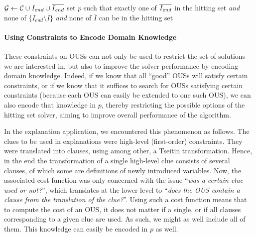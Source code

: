 \begin{algorithm}[ht]
  \caption{$\call{bestStep--c-OUS}({\cal C},f,I,I_{end})$}
  \label{alg:singleStepExplain3}
$\mathcal{G}  \gets {\cal C} \cup I_{end} \cup \overline{I_{\mathit{end}}}$\;
set $p$ such that exactly one of $\overline{I_{\mathit{end}}}$ in the hitting set \textit{and} none of $\{I_{end} \setminus I\}$ \textit{and} none of $\bar{I}$ can be in the hitting set\;
\;
\end{algorithm}



\paragraph{Using Constraints to Encode Domain Knowledge}
These constraints on OUSs can not only be used to restrict the set of solutions we are interested in, but also to improve the solver performance by encoding domain knowledge.
Indeed, if we know that all ``good'' OUSs will satisfy certain constraints, or if we know that it suffices to search for OUSs satisfying certain constraints (because each OUS can easily be extended to one such OUS),  we can also encode that knowledge in $p$, thereby restricting the possible options of the hitting set solver, aiming to improve overall performance of the algorithm. 

In the explanation application, we encountered this phenomenon as follows. 
The clues to be used in explanations were high-level (first-order) constraints. They were translated into clauses, using among other, a Tseitin transformation.
Hence, in the end the transformation of a single high-level clue consists of several clauses, of which some are definitions of newly introduced variables. 
Now, the associated cost function was only concerned with the issue ``\emph{was a certain clue used or not?}'', which translates at the lower level to ``\emph{does the OUS contain a clause from the translation of the clue?}''.
Using such a cost function means that to compute the cost of an OUS, it does not matter if a single, or if all clauses corresponding to a given clue are used. As such, we might as well include all of them. This knowledge can easily be encoded in $p$ as well. 

